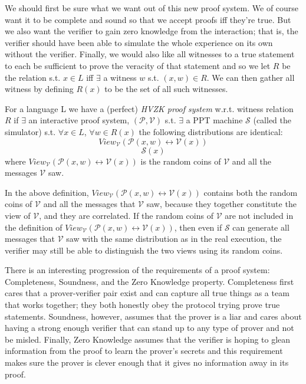 		We should first be sure what we want out of this new proof system.  We of course want it to be complete and sound so that we accept proofs iff they're true.  But we also want the verifier to gain zero knowledge from the interaction; that is, the verifier should have been able to simulate the whole experience on its own without the verifier.
		Finally, we would also like all witnesses to a true statement to each be sufficient to prove the veracity of that statement and so we let $R$ be the relation s.t. $x \in L$ iff $\exists$ a witness $w$ s.t. $(x,w)\in R$.  We can then gather all witness by defining $R(x)$ to be the set of all such witnesses.
		
		{ For a language L we have a (perfect) \textit{HVZK proof system} w.r.t. witness relation $R$ if $\exists$ an interactive proof system, $(\mathcal{P},\mathcal{V})$ s.t. $\exists$ a PPT machine $\mathcal{S}$ (called the simulator) s.t. $\forall x \in L$, $\forall w\in R(x)$ the following distributions are identical:
		$$View_{\mathcal{V}}(\mathcal{P}(x,w) \leftrightarrow \mathcal{V}(x))$$
		$$\mathcal{S}(x)$$
		where $View_{\mathcal{V}}(\mathcal{P}(x,w) \leftrightarrow \mathcal{V}(x))$ is the random coins of $\mathcal{V}$ and all the messages $\mathcal{V}$ saw.}

\begin{remark}
In the above definition, $View_{\mathcal{V}}(\mathcal{P}(x,w) \leftrightarrow \mathcal{V}(x))$ contains both the random coins of $\mathcal{V}$ and all the messages that $\mathcal{V}$ saw, because they together constitute the view of $\mathcal{V}$, and they are correlated. If the random coins of $\mathcal{V}$ are not included in the definition of $View_{\mathcal{V}}(\mathcal{P}(x,w) \leftrightarrow \mathcal{V}(x))$, then even if $\mathcal{S}$ can generate all messages that $\mathcal{V}$ saw with the same distribution as in the real execution, the verifier may still be able to distinguish the two views using its random coins.
\end{remark}
		
		There is an interesting progression of the requirements of a proof system: Completeness, Soundness, and the Zero Knowledge property.  Completeness first cares that a prover-verifier pair exist and can capture all true things as a team that works together; they both honestly obey the protocol trying prove true statements.  Soundness, however, assumes that the prover is a liar and cares about having a strong enough verifier that can stand up to any type of prover and not be misled.  Finally, Zero Knowledge assumes that the verifier is hoping to glean information from the proof to learn the prover's secrets and this requirement makes sure the prover is clever enough that it gives no information away in its proof.
		
